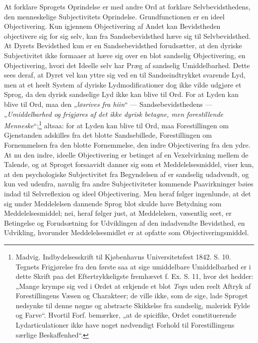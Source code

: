 \documentclass[12pt]{book}
\newcommand{\opage}[1]{\marginnote{\footnotesize\textit{[#1]}}}
\begin{document}
At forklare Sprogets Oprindelse er med andre Ord at
forklare Selvbevidsthedens, den menneskelige Subjectivitets
\opage{27}Oprindelse. Grundfunctionen er en ideel Objectivering. Kun
igjennem Objectivering af Andet kan Bevidstheden objectivere
sig for sig selv, kan fra Sandsebevidsthed hæve sig til Selvbevidsthed.
At Dyrets Bevidsthed kun er en Sandsebevidsthed
forudsætter, at den dyriske Subjectivitet ikke formaaer at hæve
sig over en blot sandselig Objectivering, en Objectivering,
hvori det Ideelle selv har Præg af sandselig Umiddelbarhed.
Dette sees deraf, at Dyret vel kan yttre sig ved en til Sandseindtrykket
svarende Lyd, men at et heelt System af dyriske
Lydmodificationer dog ikke vilde udgjøre et Sprog, da den
dyrisk sandselige Lyd ikke kan blive til Ord. For at Lyden
kan blive til Ord, maa den „\emph{løsrives fra hiin}“ --- Sandsebevidsthedens
--- „\emph{Umiddelbarhed og frigjøres af det
ikke dyrisk betagne, men forestillende Menneske}“;\footnote{Madvig.
Indbydelsesskrift til Kjøbenhavns Universitetsfest 1842.
S. 10. Tegnets Frigjørelse fra den første saa at sige umiddelbare
Umiddelbarhed er i dette Skrift paa det Eftertrykkeligste fremhævet
f. Ex. S. 11, hvor det hedder: „Mange krympe sig ved i Ordet
at erkjende et blot \emph{Tegn} uden reelt Aftryk af Forestillingens Væsen
og Charakteer; de ville ikke, som de sige, lade Sproget nedsynke til denne
nøgne og abstracte Skikkelse fra sandselig, malerisk Fylde og Farve“.
Hvortil Forf. bemærker, „at de spicifike, Ordet constituerende Lydarticulationer
ikke have noget nødvendigt Forhold til Forestillingens
særlige Beskaffenhed“.}%
altsaa: for at Lyden kan blive til Ord, maa Forestillingen om
Gjenstanden adskilles fra det blotte Sandsebillede, Forestillingen
om Fornemmelsen fra den blotte Fornemmelse, den indre
Objectivering fra den ydre. At nu den indre, ideelle Objectivering
er betinget af en Vexelvirkning mellem de Talende,
og at Sproget forsaavidt danner sig som et Meddelelsesmiddel,
viser kun, at den psychologiske Subjectivitet fra Begyndelsen
af er sandselig udadvendt, og kun ved udenfra, navnlig
fra andre Subjectiviteter kommende Paavirkninger bøies indad
til Selvreflexion og ideel Objectivering. Men heraf følger
\opage{28}ingenlunde, at det sig under Meddelelsen dannende Sprog
blot skulde have Betydning som Meddelelsesmiddel; nei, heraf
følger just, at Meddelelsen, væsentlig seet, er Betingelse og
Forudsætning for Udviklingen af den indadvendte Bevidsthed,
en Udvikling, hvorunder Meddelelsesmidlet er at opfatte som
Objectiveringsmiddel.
\end{document}
